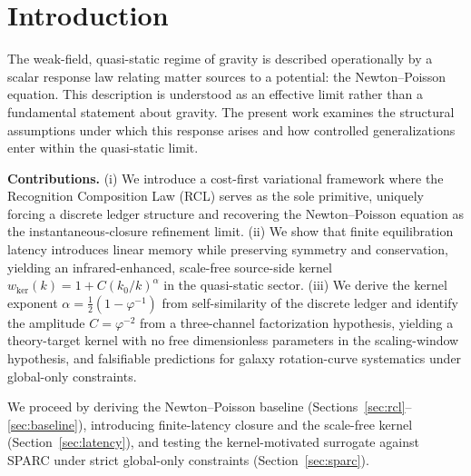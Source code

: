 \documentclass[entropy,article,submit,pdftex,moreauthors]{Definitions/mdpi}
\begin{document}

\section{Introduction}

The weak-field, quasi-static regime of gravity is described operationally by a scalar response law relating matter sources to a potential: the Newton--Poisson equation. This description is understood as an effective limit rather than a fundamental statement about gravity. The present work examines the structural assumptions under which this response arises and how controlled generalizations enter within the quasi-static limit.

\textbf{Contributions.} (i) We introduce a cost-first variational framework where the Recognition Composition Law (RCL) serves as the sole primitive, uniquely forcing a discrete ledger structure and recovering the Newton--Poisson equation as the instantaneous-closure refinement limit. (ii) We show that finite equilibration latency introduces linear memory while preserving symmetry and conservation, yielding an infrared-enhanced, scale-free source-side kernel $w_{\mathrm{ker}}(k)=1+C(k_0/k)^\alpha$ in the quasi-static sector. (iii) We derive the kernel exponent $\alpha = \tfrac{1}{2}(1-\varphi^{-1})$ from self-similarity of the discrete ledger and identify the amplitude $C=\varphi^{-2}$ from a three-channel factorization hypothesis, yielding a theory-target kernel with no free dimensionless parameters in the scaling-window hypothesis, and falsifiable predictions for galaxy rotation-curve systematics under global-only constraints.

We proceed by deriving the Newton–Poisson baseline (Sections~\ref{sec:rcl}--\ref{sec:baseline}), introducing finite-latency closure and the scale-free kernel (Section~\ref{sec:latency}), and testing the kernel-motivated surrogate against SPARC under strict global-only constraints (Section~\ref{sec:sparc}).

\end{document}
